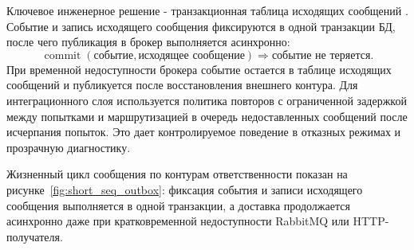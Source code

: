 Ключевое инженерное решение - транзакционная таблица исходящих сообщений \cite{transactional_outbox,rabbitmq_docs}. Событие и запись исходящего сообщения фиксируются в одной транзакции БД, после чего публикация в брокер выполняется асинхронно:
\begin{equation}
\operatorname{commit}(\text{событие}, \text{исходящее сообщение}) \Rightarrow \text{событие не теряется}.
\end{equation}
При временной недоступности брокера событие остается в таблице исходящих сообщений и публикуется после восстановления внешнего контура.
Для интеграционного слоя используется политика повторов с ограниченной задержкой между попытками и маршрутизацией в очередь недоставленных сообщений после исчерпания попыток. Это дает контролируемое поведение в отказных режимах и прозрачную диагностику.

Жизненный цикл сообщения по контурам ответственности показан на рисунке~\ref{fig:short_seq_outbox}: фиксация события и записи исходящего сообщения выполняется в одной транзакции, а доставка продолжается асинхронно даже при кратковременной недоступности RabbitMQ или HTTP-получателя.

